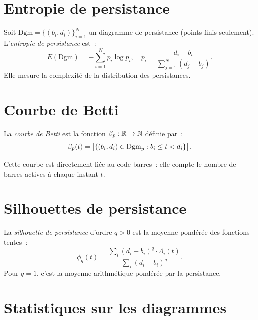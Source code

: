 \section{Entropie de persistance}

\begin{definition}
Soit $\mathrm{Dgm} = \{(b_i, d_i)\}_{i=1}^N$ un diagramme de
persistance (points finis seulement). L'\emph{entropie de persistance}
est~:
\[
  E(\mathrm{Dgm}) = -\sum_{i=1}^{N} p_i \log p_i, \quad
  p_i = \frac{d_i - b_i}{\sum_{j=1}^N (d_j - b_j)}.
\]
Elle mesure la complexit\'e de la distribution des persistances.
\end{definition}

\section{Courbe de Betti}

\begin{definition}
La \emph{courbe de Betti} est la fonction $\beta_p : \mathbb{R} \to \mathbb{N}$
d\'efinie par~:
\[
  \beta_p(t) = \left| \{(b_i, d_i) \in \mathrm{Dgm}_p : b_i \leq t < d_i\} \right|.
\]
\end{definition}

Cette courbe est directement li\'ee au code-barres~: elle compte le
nombre de barres actives \`a chaque instant $t$.

\section{Silhouettes de persistance}

\begin{definition}
La \emph{silhouette de persistance} d'ordre $q > 0$ est la moyenne
pond\'er\'ee des fonctions tentes~:
\[
  \phi_q(t) = \frac{\sum_i (d_i - b_i)^q \cdot \Lambda_i(t)}
  {\sum_i (d_i - b_i)^q}.
\]
Pour $q = 1$, c'est la moyenne arithm\'etique pond\'er\'ee par la
persistance.
\end{definition}

\section{Statistiques sur les diagrammes}

